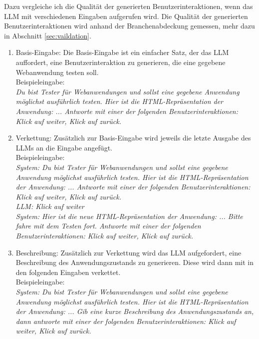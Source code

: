 Dazu vergleiche ich die Qualität der generierten Benutzerinteraktionen, wenn das LLM mit verschiedenen Eingaben aufgerufen wird.
Die Qualität der generierten Benutzerinteraktionen wird anhand der Branchenabdeckung gemessen, mehr dazu in Abschnitt \ref{sec:vaildation}.

\begin{enumerate}
    \item Basis-Eingabe: Die Basis-Eingabe ist ein einfacher Satz, der das LLM auffordert, eine Benutzerinteraktion zu generieren, die eine gegebene Webanwendung testen soll.
    \\
    Beispieleingabe:
    \\
    \textit{Du bist Tester für Webanwendungen und sollst eine gegebene Anwendung möglichst ausführlich testen.
    Hier ist die HTML-Repräsentation der Anwendung: ...
    Antworte mit einer der folgenden Benutzerinteraktionen: Klick auf \dq weiter\dq, Klick auf \dq zurück\dq.}
    \item Verkettung: Zusätzlich zur Basis-Eingabe wird jeweils die letzte Ausgabe des LLMs an die Eingabe angefügt.
    \\
    Beispieleingabe:
    \\
    \textit{System: Du bist Tester für Webanwendungen und sollst eine gegebene Anwendung möglichst ausführlich testen.
    Hier ist die HTML-Repräsentation der Anwendung: ...
    Antworte mit einer der folgenden Benutzerinteraktionen: Klick auf \dq weiter\dq, Klick auf \dq zurück\dq.
    \\
    LLM: Klick auf \dq weiter\dq
    \\
    System: Hier ist die neue HTML-Repräsentation der Anwendung: ... Bitte fahre mit dem Testen fort. Antworte mit einer der folgenden Benutzerinteraktionen: Klick auf \dq weiter\dq, Klick auf \dq zurück\dq.
    }
    \item Beschreibung: Zusätzlich zur Verkettung wird das LLM aufgefordert, eine Beschreibung des Anwendungszustands zu generieren. Diese wird dann mit in den folgenden Eingaben verkettet.
    \\
    Beispieleingabe:
    \\
    \textit{System: Du bist Tester für Webanwendungen und sollst eine gegebene Anwendung möglichst ausführlich testen.
    Hier ist die HTML-Repräsentation der Anwendung: ... 
    Gib eine kurze Beschreibung des Anwendungszustands an, dann antworte mit einer der folgenden Benutzerinteraktionen: Klick auf \dq weiter\dq, Klick auf \dq zurück\dq.
    \\
}
\end{enumerate}
